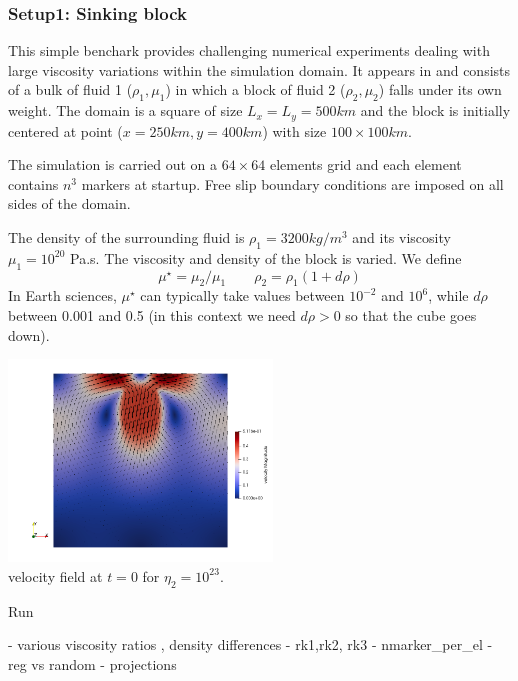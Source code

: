 

\subsubsection{Setup1: Sinking block} 

This simple benchark provides challenging numerical experiments dealing with large viscosity variations 
within the simulation domain. It appears in \cite{gery10,thie11} 
and consists of a bulk of fluid 1 ($\rho_1,\mu_1$)
in which a block of fluid 2 ($\rho_2,\mu_2$) falls under its own weight.
The domain is a square of size $L_x=L_y=500km$ and the block is initially centered at point ($x=250km,y=400km$) with size $100\times100km$. 

The simulation is carried out on a $64\times64$ elements grid and each element contains $n^3$ markers
at startup. Free slip boundary conditions are imposed on all sides of the domain. 

The density of the surrounding fluid is $\rho_1=3200kg/m^3$
and its viscosity $\mu_1=10^{20}$ Pa.s.
The viscosity and density of the block is varied. We define
\[
\mu^\star=\mu_2/\mu_1
\quad\quad
\rho_2=\rho_1 (1 + d\rho)
\]
In Earth sciences, $\mu^\star$ can typically take values between $10^{-2}$ and $10^6$,
while $d\rho$ between 0.001 and 0.5 (in this context we need $d\rho>0$ so that the cube 
goes down).

\begin{center}
\includegraphics[width=7cm]{python_codes/fieldstone_67/sinking/vel0}\\
{\captionfont velocity field at $t=0$ for $\eta_2=10^{23}$.}
\end{center}

Run 

- various viscosity ratios , density differences
- rk1,rk2, rk3
- nmarker\_per\_el
- reg vs random
- projections




